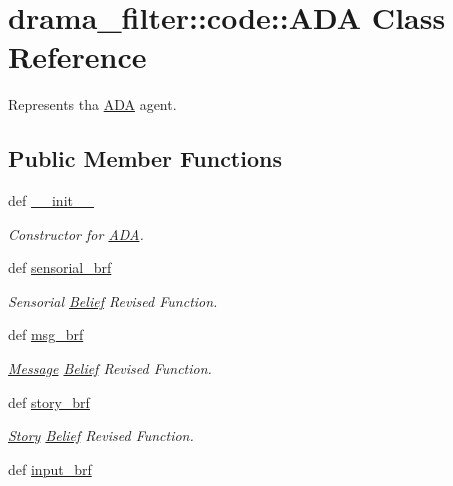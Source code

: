 \hypertarget{classdrama__filter_1_1code_1_1ADA}{
\section{drama\_\-filter::code::ADA Class Reference}
\label{classdrama__filter_1_1code_1_1ADA}
}


Represents tha \hyperlink{classdrama__filter_1_1code_1_1ADA}{ADA} agent.  


\subsection*{Public Member Functions}
\begin{DoxyCompactItemize}
\item 
def \hyperlink{classdrama__filter_1_1code_1_1ADA_a9b7469866638569d5a728d0f013fd6b6}{\_\-\_\-init\_\-\_\-}
\begin{DoxyCompactList}\small\item\em Constructor for \hyperlink{classdrama__filter_1_1code_1_1ADA}{ADA}. \end{DoxyCompactList}\item 
def \hyperlink{classdrama__filter_1_1code_1_1ADA_a6658fb4f3131fbf1316dbbe055d95fb2}{sensorial\_\-brf}
\begin{DoxyCompactList}\small\item\em Sensorial \hyperlink{classdrama__filter_1_1code_1_1Belief}{Belief} Revised Function. \end{DoxyCompactList}\item 
def \hyperlink{classdrama__filter_1_1code_1_1ADA_a014b5ca0de62c6d66c7a36c36be31efe}{msg\_\-brf}
\begin{DoxyCompactList}\small\item\em \hyperlink{classdrama__filter_1_1code_1_1Message}{Message} \hyperlink{classdrama__filter_1_1code_1_1Belief}{Belief} Revised Function. \end{DoxyCompactList}\item 
def \hyperlink{classdrama__filter_1_1code_1_1ADA_a2fc68473ba3bd9b5381bb963dc006a34}{story\_\-brf}
\begin{DoxyCompactList}\small\item\em \hyperlink{classdrama__filter_1_1code_1_1Story}{Story} \hyperlink{classdrama__filter_1_1code_1_1Belief}{Belief} Revised Function. \end{DoxyCompactList}\item 
def \hyperlink{classdrama__filter_1_1code_1_1ADA_ae3c1893eb2fb53838d46d70657265b13}{input\_\-brf}

\end{DoxyCompactItemize}
